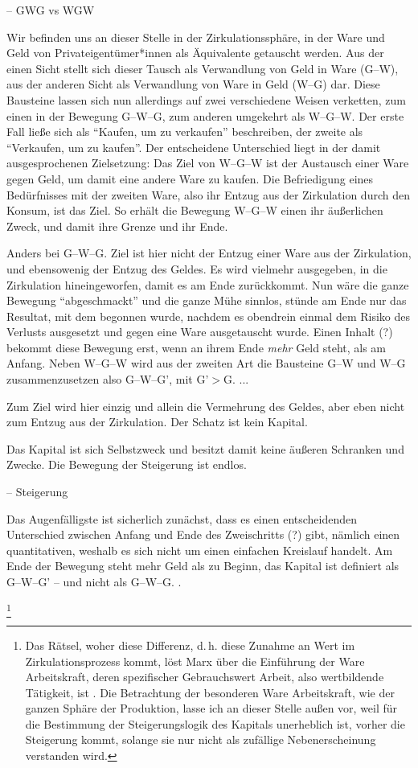 \documentclass[12pt,
               DIV13,
               paper=a4,
               twoside=false,
               onehalfspacing,
               bibliography=totoc,
               toc=graduated,
               draft,
               ]{scrartcl}
\newcommand{\vgl}[2]{\parencite[vgl.][#1]{#2}}
\newcommand{\worries}[1]{\ifdraft{\textcolor{blue}{\texttt{(#1)}}}{}}
\newcommand{\gwg}{G--W--G'\xspace}
\newcommand{\wgw}{W--G--W\xspace}
\begin{document}
-- GWG vs WGW

Wir befinden uns an dieser Stelle in der Zirkulationssphäre, in der
Ware und Geld von Privateigentümer*innen als Äquivalente getauscht
werden. Aus der einen Sicht stellt sich dieser Tausch als Verwandlung
von Geld in Ware (G--W), aus der anderen Sicht als Verwandlung von
Ware in Geld (W--G) dar. Diese Bausteine lassen sich nun
allerdings auf zwei verschiedene Weisen verketten, zum einen in der 
Bewegung G--W--G, zum anderen umgekehrt als \wgw. Der erste Fall
ließe sich als "`Kaufen, um zu verkaufen"' beschreiben, der zweite als
"`Verkaufen, um zu kaufen"'. Der entscheidene Unterschied liegt in der
damit ausgesprochenen Zielsetzung: Das Ziel von \wgw ist der Austausch
einer Ware gegen Geld, um damit eine andere Ware zu kaufen. Die
Befriedigung eines Bedürfnisses mit der zweiten Ware, also ihr Entzug
aus der Zirkulation durch den Konsum, ist das Ziel. So erhält die
Bewegung \wgw einen ihr äußerlichen Zweck, und damit ihre
Grenze und ihr Ende.

Anders bei G--W--G. Ziel ist hier nicht der Entzug einer Ware aus der
Zirkulation, und ebensowenig der Entzug des Geldes. Es wird vielmehr
ausgegeben, in die Zirkulation hineingeworfen, damit es am Ende
zurückkommt. Nun wäre die ganze Bewegung "`abgeschmackt"' und die
ganze Mühe sinnlos, stünde am Ende nur das Resultat, mit dem begonnen
wurde, nachdem es obendrein einmal dem Risiko des Verlusts ausgesetzt
und gegen eine Ware ausgetauscht wurde. Einen Inhalt (?) bekommt diese
Bewegung erst, wenn an ihrem Ende \emph{mehr} Geld steht, als am
Anfang. Neben \wgw wird aus der zweiten Art die Bausteine G--W und
W--G zusammenzusetzen also \gwg, mit G'$>$G. ...

Zum Ziel wird hier einzig und allein die Vermehrung des Geldes, aber
eben nicht zum Entzug aus der Zirkulation. Der Schatz ist kein
Kapital.

Das Kapital ist sich Selbstzweck und
besitzt damit keine äußeren Schranken und Zwecke. Die Bewegung der
Steigerung ist endlos.

-- Steigerung

Das Augenfälligste ist sicherlich zunächst, dass es einen
entscheidenden Unterschied zwischen Anfang und Ende des Zweischritts
(?) gibt, nämlich einen quantitativen, weshalb es sich nicht um einen
einfachen Kreislauf handelt. Am Ende der Bewegung steht mehr Geld als
zu Beginn, das Kapital ist definiert als \gwg{} -- und nicht als
G--W--G. \worries{sonst "`abgeschmackt"' (Marx)}.

\footnote{Das Rätsel,
woher diese Differenz, d.\,h. diese Zunahme an Wert im
Zirkulationsprozess kommt, löst Marx über die Einführung der Ware
Arbeitskraft, deren spezifischer Gebrauchswert Arbeit, also
wertbildende Tätigkeit, ist \vgl{xx}{kap}. Die Betrachtung der
besonderen Ware Arbeitskraft, wie der ganzen Sphäre der Produktion,
lasse ich an dieser Stelle außen vor, weil für die Bestimmung der
Steigerungslogik des Kapitals unerheblich ist, vorher die Steigerung
kommt, solange sie nur nicht als zufällige Nebenerscheinung verstanden
wird.}
\end{document}
